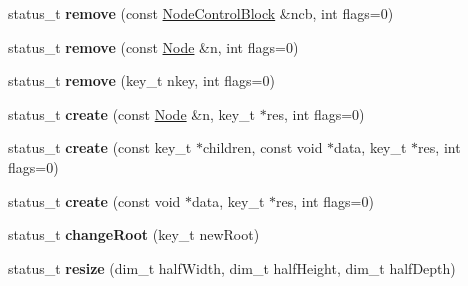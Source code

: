 \begin{DoxyCompactItemize}
\mbox{\label{class_hash_octree_1_1_hash_octree_a7943b3b188e74d60a1fda9481790de9f}} 
status\+\_\+t {\bfseries remove} (const \mbox{\hyperlink{class_hash_octree_1_1_node_control_block}{Node\+Control\+Block}} \&ncb, int flags=0)
\item 
\mbox{\label{class_hash_octree_1_1_hash_octree_a124574ae9ee2a67f570e21fd5fb514e6}} 
status\+\_\+t {\bfseries remove} (const \mbox{\hyperlink{class_hash_octree_1_1_node}{Node}} \&n, int flags=0)
\item 
\mbox{\label{class_hash_octree_1_1_hash_octree_a7dd230a896779e16fb86a2f85c84e67a}} 
status\+\_\+t {\bfseries remove} (key\+\_\+t nkey, int flags=0)
\item 
\mbox{\label{class_hash_octree_1_1_hash_octree_ae31f35cf0eeab0d7ec255e8ebb7e57cf}} 
status\+\_\+t {\bfseries create} (const \mbox{\hyperlink{class_hash_octree_1_1_node}{Node}} \&n, key\+\_\+t $\ast$res, int flags=0)
\item 
\mbox{\label{class_hash_octree_1_1_hash_octree_a873642eaadcddbe0b09783c6093faef8}} 
status\+\_\+t {\bfseries create} (const key\+\_\+t $\ast$children, const void $\ast$data, key\+\_\+t $\ast$res, int flags=0)
\item 
\mbox{\label{class_hash_octree_1_1_hash_octree_acf3533b7fd71b655818c97ee7acb2e82}} 
status\+\_\+t {\bfseries create} (const void $\ast$data, key\+\_\+t $\ast$res, int flags=0)
\item 
\mbox{\label{class_hash_octree_1_1_hash_octree_aa79e8b65dfb51c666074b12c693cea5c}} 
status\+\_\+t {\bfseries change\+Root} (key\+\_\+t new\+Root)
\item 
\mbox{\label{class_hash_octree_1_1_hash_octree_ad4821f26085b729920cdf5f6dcc4566f}} 
status\+\_\+t {\bfseries resize} (dim\+\_\+t half\+Width, dim\+\_\+t half\+Height, dim\+\_\+t half\+Depth)
\item 
\mbox{\label{class_hash_octree_1_1_hash_octree_a898985692691738c8ebac68adfed4326}} 

\end{DoxyCompactItemize}
